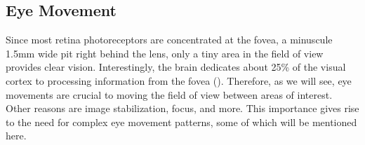 



\subsection{Eye Movement}
Since most retina photoreceptors are concentrated at the fovea, a minuscule 1.5mm wide pit right behind the lens, only a tiny area in the field of view provides clear vision. Interestingly, the brain dedicates about 25\% of the visual cortex to processing information from the fovea (\cite{hubel1974}). Therefore, as we will see, eye movements are crucial to moving the field of view between areas of interest. Other reasons are image stabilization, focus, and more. This importance gives rise to the need for complex eye movement patterns, some of which will be mentioned here.

